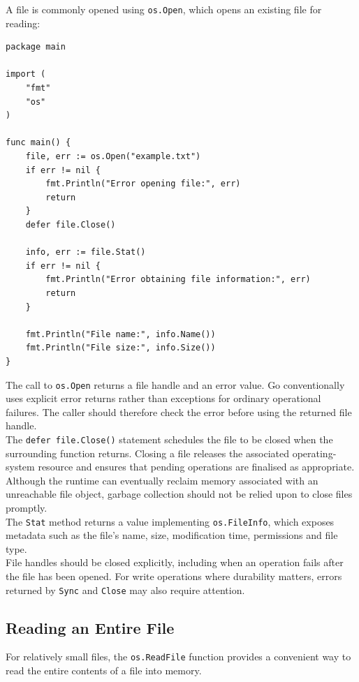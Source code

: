 A file is commonly opened using \texttt{os.Open}, which opens an existing file for reading:

\begin{lstlisting}
package main

import (
    "fmt"
    "os"
)

func main() {
    file, err := os.Open("example.txt")
    if err != nil {
        fmt.Println("Error opening file:", err)
        return
    }
    defer file.Close()

    info, err := file.Stat()
    if err != nil {
        fmt.Println("Error obtaining file information:", err)
        return
    }

    fmt.Println("File name:", info.Name())
    fmt.Println("File size:", info.Size())
}
\end{lstlisting}

The call to \texttt{os.Open} returns a file handle and an error value. Go conventionally uses explicit error returns rather than exceptions for ordinary operational failures. The caller should therefore check the error before using the returned file handle.\\

The \texttt{defer file.Close()} statement schedules the file to be closed when the surrounding function returns. Closing a file releases the associated operating-system resource and ensures that pending operations are finalised as appropriate. Although the runtime can eventually reclaim memory associated with an unreachable file object, garbage collection should not be relied upon to close files promptly.\\

The \texttt{Stat} method returns a value implementing \texttt{os.FileInfo}, which exposes metadata such as the file's name, size, modification time, permissions and file type.\\

File handles should be closed explicitly, including when an operation fails after the file has been opened. For write operations where durability matters, errors returned by \texttt{Sync} and \texttt{Close} may also require attention.

\subsection{Reading an Entire File}

For relatively small files, the \texttt{os.ReadFile} function provides a convenient way to read the entire contents of a file into memory.

